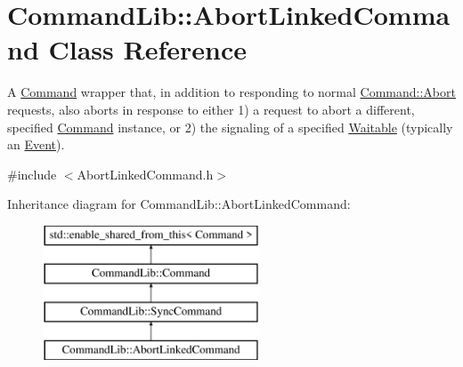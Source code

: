 \hypertarget{class_command_lib_1_1_abort_linked_command}{}\section{Command\+Lib\+:\+:Abort\+Linked\+Command Class Reference}
\label{class_command_lib_1_1_abort_linked_command}


A \mbox{\hyperlink{class_command_lib_1_1_command}{Command}} wrapper that, in addition to responding to normal \mbox{\hyperlink{class_command_lib_1_1_command_a247cbc7325e3b9d9d7044d449b989aa6}{Command\+::\+Abort}} requests, also aborts in response to either 1) a request to abort a different, specified \mbox{\hyperlink{class_command_lib_1_1_command}{Command}} instance, or 2) the signaling of a specified \mbox{\hyperlink{class_command_lib_1_1_waitable}{Waitable}} (typically an \mbox{\hyperlink{class_command_lib_1_1_event}{Event}}).  




{\ttfamily \#include $<$Abort\+Linked\+Command.\+h$>$}

Inheritance diagram for Command\+Lib\+:\+:Abort\+Linked\+Command\+:\begin{figure}[H]
\begin{center}
\leavevmode
\includegraphics[height=4.000000cm]{class_command_lib_1_1_abort_linked_command}
\end{center}
\end{figure}

